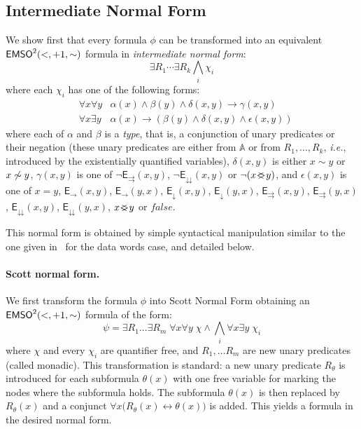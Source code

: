 \documentclass{CSML}
\newcommand\dataeq{\ensuremath{\sim}}
\newcommand\neighbor{\ensuremath{\mathord{+}1}}
\newcommand\descendant{\ensuremath{\mathord{<}}}
\newcommand\emsotwo{\ensuremath{\emso^2(\descendant,\neighbor,\mathord{\sim})}\xspace}
\newcommand\A{\ensuremath{\mathbb{A}}\xspace}
\newcommand\EE{\mathsf{E}}
\newcommand\NS{\EE_{\rightarrow}}
\newcommand\PC{\EE_{\downarrow}}
\newcommand\SAD{\EE_{\downdownarrows}}
\newcommand\SFS{\EE_{\rightrightarrows}}
\renewcommand\parallel{\mathbin{\!<\mkern-12mu>\!}}
\begin{document}
\subsection{Intermediate Normal Form} \label{app:normal-form}
We show first that every \fotwo formula $\phi$ can be transformed into an equivalent \emsotwo formula
in \emph{intermediate normal form}:
\begin{equation*}
\exists R_1\cdots \exists R_k \bigwedge_i \chi_i 
\end{equation*}
where each $\chi_i$ has one of the following forms:
\begin{eqnarray}
 & \forall x \forall y & \alpha(x) \wedge \beta(y) \wedge \delta(x, y) \to \gamma(x, y) 
\label{eq:inf-fafa}\\
 & \forall x \exists y & \alpha(x) \to (\beta(y) \wedge \delta(x, y) \wedge
 \epsilon(x, y)) 
\label{eq:inf-faex}
\end{eqnarray}
where each of $\alpha$ and $\beta$ is a \emph{type}, 
that is, a conjunction of unary predicates or their negation 
(these unary predicates are either from \A or from $R_1,\ldots,R_k$, 
\textit{i.e.}, introduced by the existentially quantified variables),
$\delta(x, y)$ is either $x \dataeq y$ or $x \not\dataeq y$,
$\gamma(x, y)$ is one of 
      $\neg \SFS(x, y)$, $\neg \SAD(x, y)$ 
      or $\neg (x \parallel y)$,
and
$\epsilon(x, y)$ is one of
$x = y$, 
$\NS(x, y)$, 
$\NS(y, x)$, 
$\PC(x, y)$,
$\PC(y, x)$,
$\SFS(x, y)$, 
$\SFS(y, x)$, 
$\SAD(x, y)$,
$\SAD(y, x)$,
$x \parallel y$ or $\mathit{false}$.

This normal form is obtained by simple syntactical manipulation 
similar to the one given in~\cite{BDMSS11} for the data words case, and detailed below. 

\paragraph{\bf Scott normal form.}
We first transform the formula $\phi$ into Scott Normal Form
obtaining an \emsotwo formula of the form:
\[
\psi = 
\exists R_1 \ldots \exists R_m\; \forall x \forall y\; \chi \wedge 
\bigwedge_{i} \forall x \exists y\; \chi_i
\]
where $\chi$ and every $\chi_i$ are quantifier free, 
and $R_1, \ldots R_m$ are new unary predicates (called monadic).
This transformation is standard: 
a new unary predicate $R_\theta$ is introduced
for each subformula $\theta(x)$ with one free variable for marking the
nodes where the subformula holds. The subformula $\theta(x)$ is then
replaced by $R_\theta(x)$ and a conjunct 
$\forall x \bigl(R_\theta(x) \leftrightarrow \theta(x)\bigr)$ is added. 
This yields a formula in the desired normal form.
\end{document}
